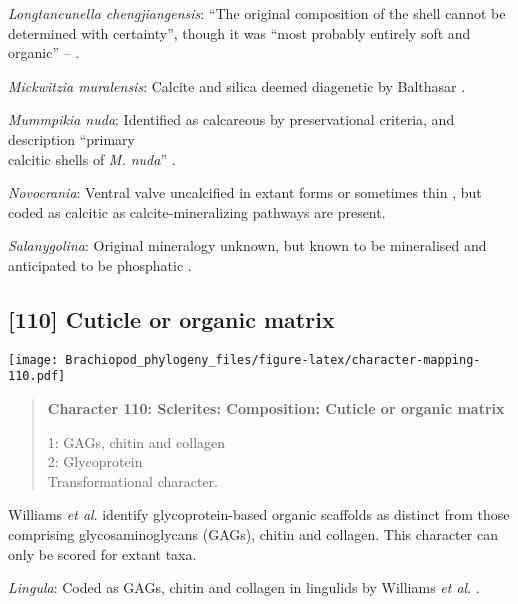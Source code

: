 \documentclass[openany]{book}
\theoremstyle{definition}
\theoremstyle{definition}
\theoremstyle{definition}
\theoremstyle{remark}
\begin{document}
\hypertarget{Longtancunella_chengjiangensis-coding-109}{}
\emph{Longtancunella chengjiangensis}: ``The original composition of the
shell cannot be determined with certainty'', though it was ``most
probably entirely soft and organic'' --
\citet{Zhang2011Theexceptionally}.

\hypertarget{Mickwitzia_muralensis-coding-109}{}
\emph{Mickwitzia muralensis}: Calcite and silica deemed diagenetic by
Balthasar \citeyearpar{Balthasar2004Shellstructure}.

\hypertarget{Mummpikia_nuda-coding-109}{}
\emph{Mummpikia nuda}: Identified as calcareous by preservational
criteria, and description ``primary\\
calcitic shells of \emph{M. nuda}'' \citep{Balthasar2008iMummpikia}.

\hypertarget{Novocrania-coding-109}{}
\emph{Novocrania}: Ventral valve uncalcified in extant forms or
sometimes thin \citep{Williams2000LinguliformeaCraniiformea}, but coded
as calcitic as calcite-mineralizing pathways are present.

\hypertarget{Salanygolina-coding-109}{}
\emph{Salanygolina}: Original mineralogy unknown, but known to be
mineralised and anticipated to be phosphatic
\citep{Holmer2009Theenigmatic}.

\subsection*{{[}110{]} Cuticle or organic
matrix}\label{cuticle-or-organic-matrix}

\texttt{[image: Brachiopod\_phylogeny\_files/figure-latex/character-mapping-110.pdf]}

\begin{quote}
\textbf{Character 110: Sclerites: Composition: Cuticle or organic
matrix}

1: GAGs, chitin and collagen\\
2: Glycoprotein\\
Transformational character.
\end{quote}

Williams \emph{et al}. \citeyearpar{Williams1996Asupra} identify
glycoprotein-based organic scaffolds as distinct from those comprising
glycosaminoglycans (GAGs), chitin and collagen. This character can only
be scored for extant taxa.

\hypertarget{Lingula-coding-110}{}
\emph{Lingula}: Coded as GAGs, chitin and collagen in lingulids by
Williams \emph{et al}. \citeyearpar{Williams1996Asupra}.
\end{document}
